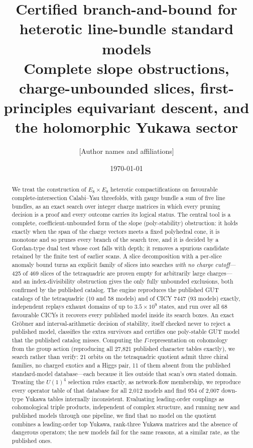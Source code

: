 \documentclass[11pt,a4paper]{article}
\title{\textbf{Certified branch-and-bound for heterotic line-bundle standard models}\\[4pt]
\large Complete slope obstructions, charge-unbounded slices, first-principles
equivariant descent, and the holomorphic Yukawa sector}
\author{[Author names and affiliations]}
\date{\today}
\theoremstyle{plain}
\theoremstyle{definition}
\theoremstyle{remark}
\newcommand{\Gam}{\Gamma}
\begin{document}
\maketitle

\begin{abstract}
We treat the construction of $E_8\times E_8$ heterotic compactifications on
favourable complete-intersection Calabi--Yau threefolds, with gauge bundle a sum
of five line bundles, as an exact search over integer charge matrices in which
every pruning decision is a proof and every outcome carries its logical status.
The central tool is a complete, coefficient-unbounded form of the slope
(poly-stability) obstruction: it holds exactly when the span of the charge
vectors meets a fixed polyhedral cone, it is monotone and so prunes every branch
of the search tree, and it is decided by a Gordan-type dual test whose cost falls
with depth; it removes a spurious candidate retained by the finite test of
earlier scans. A slice decomposition with a per-slice anomaly bound turns an
explicit family of slices into searches \emph{with no charge cutoff}---425 of
469 slices of the tetraquadric are proven empty for arbitrarily large
charges---and an index-divisibility obstruction gives the only fully unbounded
exclusions, both confirmed by the published catalog. The engine reproduces the
published GUT catalogs of the tetraquadric (10 and 58 models) and of CICY 7447
(93 models) exactly, independent replays exhaust domains of up to
$3.5\times10^9$ states, and run over all 68 favourable CICYs it
recovers every published model inside its search boxes. An exact Gröbner and
interval-arithmetic decision of stability, itself checked never to reject a
published model, classifies the extra survivors and certifies one poly-stable
GUT model that the published catalog misses. Computing the $\Gam$-representation on cohomology from
the group action (reproducing all 27,821 published character tables exactly), we
search rather than verify: 21 orbits on the
tetraquadric quotient admit three chiral families, no charged exotics and a Higgs
pair, 11 of them absent from the published standard-model database---each
because it lies outside that scan's own stated domain. Treating the $U(1)^4$
selection rules exactly, as network-flow membership, we reproduce every operator
table of that database for all 2,012 models and find 954 of 2,007 down-type
Yukawa tables internally inconsistent. Evaluating leading-order couplings as
cohomological triple products, independent of complex structure, and running new
and published models through one pipeline, we find that no model on the quotient
combines a leading-order top Yukawa, rank-three Yukawa matrices and the absence
of dangerous operators; the new models fail for the same reasons, at a similar
rate, as the published ones.
\end{abstract}
\end{document}
